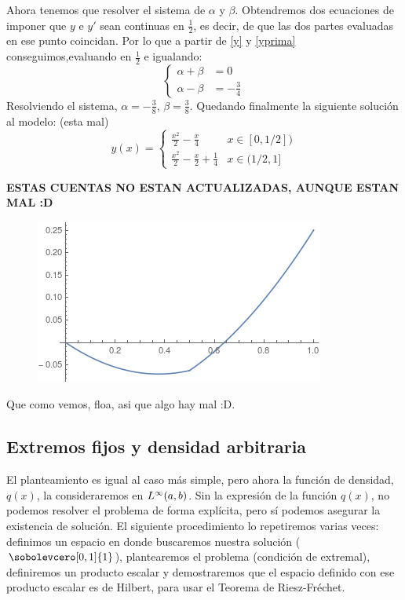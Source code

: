 Ahora tenemos que resolver el sistema de $\alpha$ y $\beta$. Obtendremos dos ecuaciones de imponer que $y$ e $y'$ sean continuas en $\frac{1}{2}$, es decir, de que las dos partes evaluadas en ese punto coincidan. Por lo que a partir de \eqref{y} y \eqref{yprima} conseguimos,evaluando en $\frac{1}{2}$ e igualando:
\begin{equation}
\left\{
\begin{array}{cc}
\alpha+\beta & =0 \\
\alpha-\beta & =-\frac{3}{4}
\end{array}
\right.
\end{equation}
Resolviendo el sistema, $\alpha=-\frac{3}{8}$, $\beta=\frac{3}{8}$. Quedando finalmente la siguiente solución al modelo: (esta mal)
\begin{equation}\label{y}
y(x)=\left\{
\begin{array}{cc}
\frac{x^2}{2}-\frac{x}{4} & x\in[0,1/2]) \\
\frac{x^2}{2}-\frac{x}{2}+\frac{1}{4} & x\in(1/2,1]
\end{array}
\right.
\end{equation}

\textbf{ESTAS CUENTAS NO ESTAN ACTUALIZADAS, AUNQUE ESTAN MAL :D}

\begin{figure}[h]
   \center
  \includegraphics[scale=0.6]{img/puenteflotante.png}
\end{figure}

Que como vemos, floa, asi que algo hay mal :D.

\subsection{Extremos fijos y densidad arbitraria}

El planteamiento es igual al caso más simple, pero ahora la función de densidad, $q(x)$, la consideraremos en $L^{ \infty }(a,b)$. Sin la expresión de la función $q(x)$, no podemos resolver el problema de forma explícita, pero sí podemos asegurar la existencia de solución. El siguiente procedimiento lo repetiremos varias veces: definimos un espacio en donde buscaremos nuestra solución ($\sobolevcero[0,1]{1}$), plantearemos el problema (condición de extremal), definiremos un producto escalar y demostraremos que el espacio definido con ese producto escalar es de Hilbert, para usar el Teorema de Riesz-Fréchet.

